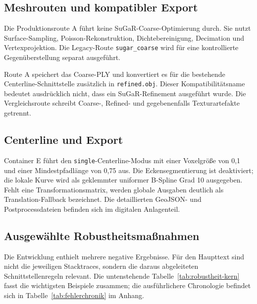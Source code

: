 \subsection{Meshrouten und kompatibler Export}

Die Produktionsroute A führt keine SuGaR-Coarse-Optimierung durch. Sie nutzt
Surface-Sampling, Poisson-Rekonstruktion, Dichtebereinigung, Decimation und
Vertexprojektion. Die Legacy-Route \texttt{sugar\_coarse} wird für eine
kontrollierte Gegenüberstellung separat ausgeführt.

Route A speichert das Coarse-PLY und konvertiert es für die bestehende
Centerline-Schnittstelle zusätzlich in \texttt{refined.obj}. Dieser
Kompatibilitätsname bedeutet ausdrücklich nicht, dass ein SuGaR-Refinement
ausgeführt wurde. Die Vergleichsroute schreibt Coarse-, Refined- und
gegebenenfalls Texturartefakte getrennt.

\subsection{Centerline und Export}

Container E führt den \texttt{single}-Centerline-Modus mit einer Voxelgröße von
0,1 und einer Mindestpfadlänge von 0,75 aus. Die Eckensegmentierung ist
deaktiviert; die lokale Kurve wird als geklemmter uniformer B-Spline Grad 10
ausgegeben. Fehlt eine Transformationsmatrix, werden globale Ausgaben deutlich
als Translation-Fallback bezeichnet. Die detaillierten GeoJSON- und
Postprocessdateien befinden sich im digitalen Anlagenteil.

\subsection{Ausgewählte Robustheitsmaßnahmen}

Die Entwicklung enthielt mehrere negative Ergebnisse. Für den Haupttext sind
nicht die jeweiligen Stacktraces, sondern die daraus abgeleiteten
Schnittstellenregeln relevant. Die untenstehende Tabelle~\ref{tab:robustheit-kern} fasst die
wichtigsten Beispiele zusammen; die ausführlichere Chronologie befindet sich
in Tabelle~\ref{tab:fehlerchronik} im Anhang.

